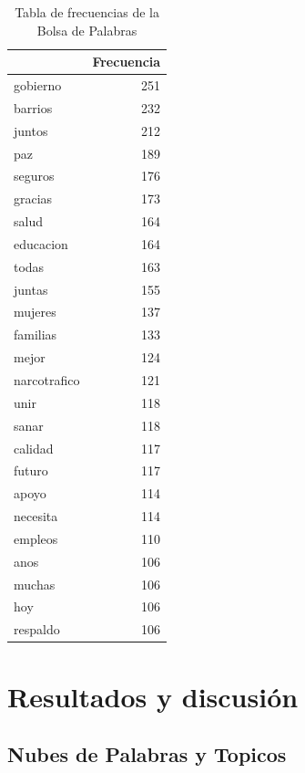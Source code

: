 \documentclass[
  10pt,
  letterpaper,
]{report}
\begin{document}
\begin{table}[!h]

\caption{\label{tab:T1_topF}Tabla de frecuencias de la Bolsa de Palabras}
\centering
\begin{tabular}[t]{l|r}
\hline
  & Frecuencia\\
\hline
gobierno & 251\\
\hline
barrios & 232\\
\hline
juntos & 212\\
\hline
paz & 189\\
\hline
seguros & 176\\
\hline
gracias & 173\\
\hline
salud & 164\\
\hline
educacion & 164\\
\hline
todas & 163\\
\hline
juntas & 155\\
\hline
mujeres & 137\\
\hline
familias & 133\\
\hline
mejor & 124\\
\hline
narcotrafico & 121\\
\hline
unir & 118\\
\hline
sanar & 118\\
\hline
calidad & 117\\
\hline
futuro & 117\\
\hline
apoyo & 114\\
\hline
necesita & 114\\
\hline
empleos & 110\\
\hline
anos & 106\\
\hline
muchas & 106\\
\hline
hoy & 106\\
\hline
respaldo & 106\\
\hline
\end{tabular}
\end{table}

\newpage

\hypertarget{resultados-y-discusiuxf3n}{%
\chapter{Resultados y discusión}\label{resultados-y-discusiuxf3n}}

\hypertarget{nubes-de-palabras-y-topicos}{%
\section{Nubes de Palabras y
Topicos}\label{nubes-de-palabras-y-topicos}}
\end{document}
